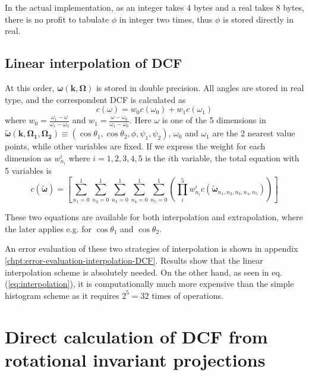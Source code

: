 In the actual implementation, as an integer takes 4 bytes and a real
takes 8 bytes, there is no profit to tabulate $\phi$ in integer two
times, thus $\phi$ is stored directly in real.


\subsection{Linear interpolation of DCF\label{sub:Linear-interpolation-of}}

At this order, $\boldsymbol{\omega}(\mathbf{k},\mathbf{\Omega})$
is stored in double precision. All angles are stored in real type,
and the correspondent DCF is calculated as
\begin{equation}
c(\omega)=w_{0}c(\omega_{0})+w_{1}c(\omega_{1})
\end{equation}
where $w_{0}=\frac{\omega_{1}-\omega}{\omega_{1}-\omega_{0}}$ and
$w_{1}=\frac{\omega-\omega_{0}}{\omega_{1}-\omega_{0}}$. Here $\omega$
is one of the 5 dimensions in $\tilde{\boldsymbol{\omega}}(\mathbf{k},\mathbf{\Omega_{1}},\mathbf{\Omega_{2}})\equiv(\cos\theta_{1},\cos\theta_{2},\phi,\psi_{1},\psi_{2})$,
$\omega_{0}$ and $\omega_{1}$ are the 2 nearest value points, while
other variables are fixed. If we express the weight for each dimension
as $w_{n_{i}}^{i}$ where $i=1,2,3,4,5$ is the $i$th variable, the
total equation with 5 variables is
\begin{equation}
c(\tilde{\boldsymbol{\omega}})=\left[\sum_{n_{1}=0}^{1}\sum_{n_{2}=0}^{1}\sum_{n_{3}=0}^{1}\sum_{n_{4}=0}^{1}\sum_{n_{5}=0}^{1}\left(\prod_{i}^{5}w_{n_{i}}^{i}c(\tilde{\boldsymbol{\omega}}_{n_{1},n_{2},n_{3},n_{4},n_{5}})\right)\right]\label{eq:interpolation}
\end{equation}


These two equations are available for both interpolation and extrapolation,
where the later applies e.g. for $\cos\theta_{1}$ and $\cos\theta_{2}$. 

An error evaluation of these two strategies of interpolation is shown
in appendix \ref{chpt:error-evaluation-interpolation-DCF}. Results
show that the linear interpolation scheme is absolutely needed. On
the other hand, as seen in eq. (\ref{eq:interpolation}), it is computationally
much more expensive than the simple histogram scheme as it requires
$2^{5}=32$ times of operations.


\section{Direct calculation of DCF from rotational invariant projections}

